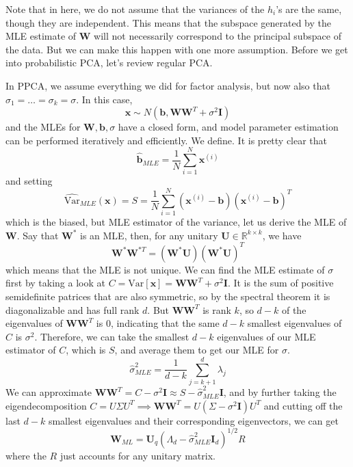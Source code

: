 \documentclass{article}
\begin{document}
    Note that in here, we do not assume that the variances of the $h_i$'s are the same, though they are independent. This means that the subspace generated by the MLE estimate of $\mathbf{W}$ will not necessarily correspond to the principal subspace of the data. But we can make this happen with one more assumption. Before we get into probabilistic PCA, let's review regular PCA. 

    \begin{example}[PCA] 
        
    \end{example} 

    \begin{example} 
    In PPCA, we assume everything we did for factor analysis, but now also that $\sigma_1 = \ldots = \sigma_k = \sigma$. In this case, 
    \[\mathbf{x} \sim N(\mathbf{b}, \mathbf{W}\mathbf{W}^T + \sigma^2 \mathbf{I})\]
    and the MLEs for $\mathbf{W}, \mathbf{b}, \sigma$ have a closed form, and model parameter estimation can be performed iteratively and efficiently. We define. It is pretty clear that 
    \[\hat{\mathbf{b}}_{MLE} = \frac{1}{N} \sum_{i=1}^N \mathbf{x}^{(i)}\]
    and setting 
    \[\widehat{\mathrm{Var}}_{MLE}(\mathbf{x}) = S = \frac{1}{N} \sum_{i=1}^N (\mathbf{x}^{(i)} - \mathbf{b}) (\mathbf{x}^{(i)} - \mathbf{b})^T\]
    which is the biased, but MLE estimator of the variance, let us derive the MLE of $\mathbf{W}$. Say that $\mathbf{W}^\ast$ is an MLE, then, for any unitary $\mathbf{U} \in \mathbb{R}^{k \times k}$, we have 
    \[\mathbf{W}^\ast \mathbf{W}^{\ast T} = (\mathbf{W}^\ast \mathbf{U}) (\mathbf{W}^\ast \mathbf{U})^T \]
    which means that the MLE is not unique. We can find the MLE estimate of $\sigma$ first by taking a look at $C = \mathrm{Var}[\mathbf{x}] = \mathbf{W} \mathbf{W}^T + \sigma^2 \mathbf{I}$. It is the sum of positive semidefinite patrices that are also symmetric, so by the spectral theorem it is diagonalizable and has full rank $d$. But $\mathbf{W} \mathbf{W}^T$ is rank $k$, so $d - k$ of the eigenvalues of $\mathbf{W} \mathbf{W}^T$ is $0$, indicating that the same $d-k$ smallest eigenvalues of $C$ is $\sigma^2$. Therefore, we can take the smallest $d-k$ eigenvalues of our MLE estimator of $C$, which is $S$, and average them to get our MLE for $\sigma$. 
    \[\hat{\sigma}^2_{MLE} = \frac{1}{d-k} \sum_{j=k+1}^d \lambda_j\]
    We can approximate $\mathbf{W} \mathbf{W}^T = C - \sigma^2 \mathbf{I} \approx S - \hat{\sigma}^2_{MLE} \mathbf{I}$, and by further taking the eigendecomposition $C = U \Sigma U^T \implies \mathbf{W} \mathbf{W}^T = U (\Sigma - \sigma^2 \mathbf{I}) U^T$ and cutting off the last $d-k$ smallest eigenvalues and their corresponding eigenvectors, we can get 
    \[\mathbf{W}_{ML} = \mathbf{U}_q (\Lambda_d - \hat{\sigma}_{MLE}^2 \mathbf{I}_d )^{1/2} R\] 
    where the $R$ just accounts for any unitary matrix. 
    \end{example}
\end{document}
